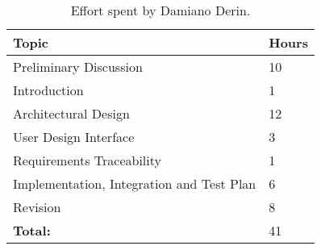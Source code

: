 \begin{table}[H]
    \centering
    \begin{tabular}{| m{} | m{} |}
        \hline
        \textbf{Topic}                                                             & \textbf{Hours} \\
        \hline
        Preliminary Discussion                                                     & 10              \\
        \hline
        Introduction                                                               & 1              \\
        \hline
        Architectural Design                                                        & 12              \\
        \hline
        User Design Interface		                                                & 3              \\
        \hline
        Requirements Traceability		                                            & 1              \\
        \hline
        Implementation, Integration and Test Plan                                    & 6              \\
        \hline
        Revision                                                                   & 8              \\
        \hline
        \hline
        \textbf{Total:}                                                            & 41             \\
        \hline
    \end{tabular}
    \caption{Effort spent by Damiano Derin.}
\end{table}
